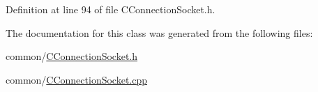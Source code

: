 \-Definition at line 94 of file \-C\-Connection\-Socket.\-h.



\-The documentation for this class was generated from the following files\-:\begin{DoxyCompactItemize}
\item 
common/\hyperlink{_c_connection_socket_8h}{\-C\-Connection\-Socket.\-h}\item 
common/\hyperlink{_c_connection_socket_8cpp}{\-C\-Connection\-Socket.\-cpp}\end{DoxyCompactItemize}
